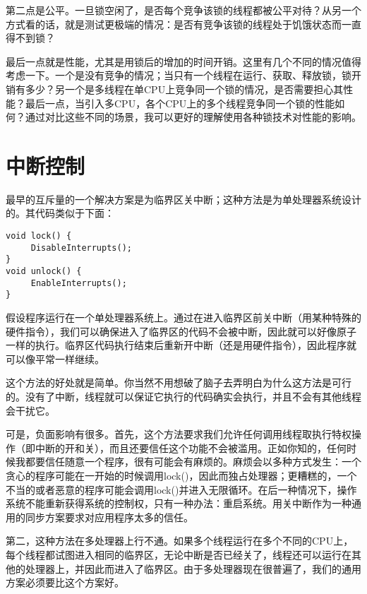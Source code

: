 第二点是公平。一旦锁空闲了，是否每个竞争该锁的线程都被公平对待？从另一个方式看的话，就是测试更极端的情况：是否有竞争该锁的线程处于饥饿状态而一直得不到锁？

最后一点就是性能，尤其是用锁后的增加的时间开销。这里有几个不同的情况值得考虑一下。一个是没有竞争的情况；当只有一个线程在运行、获取、释放锁，锁开销有多少？另一个是多线程在单CPU上竞争同一个锁的情况，是否需要担心其性能？最后一点，当引入多CPU，各个CPU上的多个线程竞争同一个锁的性能如何？通过对比这些不同的场景，我可以更好的理解使用各种锁技术对性能的影响。

\section{中断控制}
最早的互斥量的一个解决方案是为临界区关中断；这种方法是为单处理器系统设计的。其代码类似于下面：
\begin{verbatim}
void lock() {
     DisableInterrupts();
}
void unlock() {
     EnableInterrupts();
}
\end{verbatim}

假设程序运行在一个单处理器系统上。通过在进入临界区前关中断（用某种特殊的硬件指令），我们可以确保进入了临界区的代码不会被中断，因此就可以好像原子一样的执行。临界区代码执行结束后重新开中断（还是用硬件指令），因此程序就可以像平常一样继续。

这个方法的好处就是简单。你当然不用想破了脑子去弄明白为什么这方法是可行的。没有了中断，线程就可以保证它执行的代码确实会执行，并且不会有其他线程会干扰它。

可是，负面影响有很多。首先，这个方法要求我们允许任何调用线程取执行特权操作（即中断的开和关），而且还要信任这个功能不会被滥用。正如你知的，任何时候我都要信任随意一个程序，很有可能会有麻烦的。麻烦会以多种方式发生：一个贪心的程序可能在一开始的时候调用lock()，因此而独占处理器；更糟糕的，一个不当的或者恶意的程序可能会调用lock()并进入无限循环。在后一种情况下，操作系统不能重新获得系统的控制权，只有一种办法：重启系统。用关中断作为一种通用的同步方案要求对应用程序太多的信任。

第二，这种方法在多处理器上行不通。如果多个线程运行在多个不同的CPU上，每个线程都试图进入相同的临界区，无论中断是否已经关了，线程还可以运行在其他的处理器上，并因此而进入了临界区。由于多处理器现在很普遍了，我们的通用方案必须要比这个方案好。

